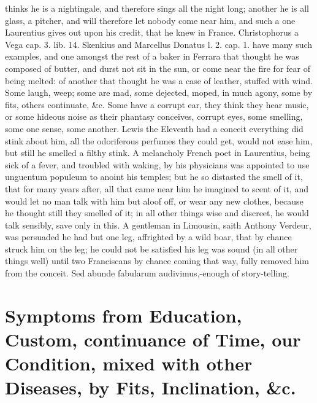 {thinks he is a nightingale, and therefore sings all the night long;
another he is all glass, a pitcher, and will therefore let nobody come
near him, and such a one Laurentius gives out upon his credit,
that he knew in France. Christophorus a Vega cap. 3. lib. 14. Skenkius
and Marcellus Donatus l. 2. cap. 1. have many such examples, and one
amongst the rest of a baker in Ferrara that thought he was composed of
butter, and durst not sit in the sun, or come near the fire for fear of
being melted: of another that thought he was a case of leather, stuffed
with wind. Some laugh, weep; some are mad, some dejected, moped, in
much agony, some by fits, others continuate, \&c. Some have a corrupt
ear, they think they hear music, or some hideous noise as their
phantasy conceives, corrupt eyes, some smelling, some one sense, some
another. Lewis the Eleventh had a conceit everything did stink
about him, all the odoriferous perfumes they could get, would not ease
him, but still he smelled a filthy stink. A melancholy French poet in
Laurentius, being sick of a fever, and troubled with waking, by
his physicians was appointed to use unguentum populeum to anoint his
temples; but he so distasted the smell of it, that for many years
after, all that came near him he imagined to scent of it, and would let
no man talk with him but aloof off, or wear any new clothes, because he
thought still they smelled of it; in all other things wise and
discreet, he would talk sensibly, save only in this. A gentleman in
Limousin, saith Anthony Verdeur, was persuaded he had but one leg,
affrighted by a wild boar, that by chance struck him on the leg; he
could not be satisfied his leg was sound (in all other things well)
until two Franciscans by chance coming that way, fully removed him from
the conceit. Sed abunde fabularum audivimus,-enough of story-telling.

\section[Symptoms from Education and Custom]{Symptoms from Education, Custom, continuance of Time, our Condition, mixed with other Diseases, by Fits, Inclination, \&c.}

}
